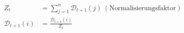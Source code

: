 \begin{align*}
    Z_t                  & =\sum_{j=1}^n\mathcal{D}_{t+1}(j)~(\text{Normalisierungsfaktor}) \\
    \mathcal{D}_{t+1}(i) & = \frac{\mathcal{D}_{t+1}(i)}{Z_t}
\end{align*}